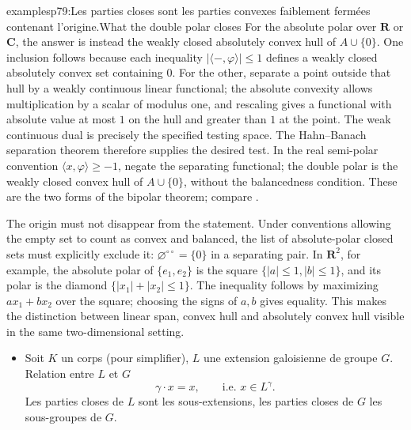 \begin{dcomment}{examples}{p79:Les parties closes sont les parties convexes faiblement fermées contenant l'origine.}{What the double polar closes}
For the absolute polar over $\mathbf R$ or $\mathbf C$, the answer is instead the weakly closed absolutely convex hull of $A\cup\{0\}$. One inclusion follows because each inequality $|\langle -,\varphi\rangle|\leq1$ defines a weakly closed absolutely convex set containing $0$. For the other, separate a point outside that hull by a weakly continuous linear functional; the absolute convexity allows multiplication by a scalar of modulus one, and rescaling gives a functional with absolute value at most $1$ on the hull and greater than $1$ at the point. The weak continuous dual is precisely the specified testing space. The Hahn--Banach separation theorem therefore supplies the desired test. In the real semi-polar convention $\langle x,\varphi\rangle\geq-1$, negate the separating functional; the double polar is the weakly closed convex hull of $A\cup\{0\}$, without the balancedness condition. These are the two forms of the bipolar theorem; compare \citet[Chapter IV, \S1, Theorem 1.5]{SchaeferWolff1999}.

The origin must not disappear from the statement. Under conventions allowing the empty set to count as convex and balanced, the list of absolute-polar closed sets must explicitly exclude it: $\varnothing^{\circ\circ}=\{0\}$ in a separating pair. In $\mathbf R^2$, for example, the absolute polar of $\{e_1,e_2\}$ is the square $\{|a|\leq1,|b|\leq1\}$, and its polar is the diamond $\{|x_1|+|x_2|\leq1\}$. The inequality follows by maximizing $ax_1+bx_2$ over the square; choosing the signs of $a,b$ gives equality. This makes the distinction between linear span, convex hull and absolutely convex hull visible in the same two-dimensional setting.
\end{dcomment}



\begin{itemize}[leftmargin=2.5em]
\item[5)] Soit $K$ un corps (pour simplifier), $L$ une extension galoisienne de groupe $G$. Relation entre $L$ et $G$
\[
\gamma\cdot x=x,\qquad \text{i.e. } x\in L^{\gamma}.
\]
Les parties closes de $L$ sont les sous-extensions, les parties closes de $G$ les sous-groupes de $G$.
\end{itemize}

